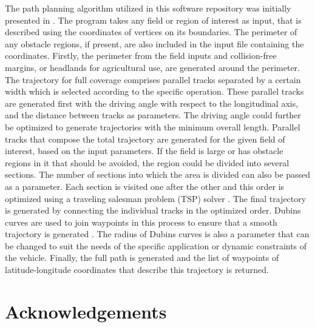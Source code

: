 \documentclass{article}
\begin{document}
The path planning algorithm utilized in this software repository was initially presented in \citep{hameed2013optimized}. The program takes any field or region of interest as input, that is described using the coordinates of vertices on its boundaries. The perimeter of any obstacle regions, if present, are also included in the input file containing the coordinates. Firstly, the perimeter from the field inputs and collision-free margins, or headlands for agricultural use, are generated around the perimeter. The trajectory for full coverage comprises parallel tracks separated by a certain width which is selected according to the specific operation. These parallel tracks are generated first with the driving angle with respect to the longitudinal axis, and the distance between tracks as parameters. The driving angle could further be optimized to generate trajectories with the minimum overall length. Parallel tracks that compose the total trajectory are generated for the given field of interest, based on the input parameters. If the field is large or has obstacle regions in it that should be avoided, the region could be divided into several sections. The number of sections into which the area is divided can also be passed as a parameter. Each section is visited one after the other and this order is optimized using a traveling salesman problem (TSP) solver \cite{goulart2021simple}. The final trajectory is generated by connecting the individual tracks in the optimized order. Dubins curves are used to join waypoints in this process to ensure that a smooth trajectory is generated \cite{sakai2018pythonrobotics}. The radius of Dubins curves is also a parameter that can be changed to suit the needs of the specific application or dynamic constraints of the vehicle. Finally, the full path is generated and the list of waypoints of latitude-longitude coordinates that describe this trajectory is returned.

\section{Acknowledgements}



\end{document}
